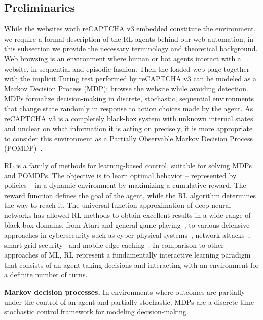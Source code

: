 \subsection{Preliminaries}

While the websites woth reCAPTCHA v3 embedded constitute the environment, we require a formal description of the \gls{RL} agents behind our web automation; in this subsection we provide the necessary terminology and theoretical background.
Web browsing is an environment where human or bot agents interact with a website, in sequential and episodic fashion.
Then the loaded web page together with the implicit Turing test performed by reCAPTCHA v3 can be modeled as a Markov Decision Process (MDP): browse the website while avoiding detection.
MDPs formalize decision-making in discrete, stochastic, sequential environments that change state randomly in response to action choices made by the agent.
As reCAPTCHA v3 is a completely black-box system with unknown internal states and unclear on what information it is acting on precisely, it is more appropriate to consider this environment as a Partially Observable Markov Decision Process (POMDP)~\cite{kaelbling1998planning}.

\gls{RL} is a family of methods for learning-based control, suitable for solving MDPs and POMDPs.
The objective is to learn optimal behavior -- represented by policies -- in a dynamic environment by maximizing a cumulative reward. 
The reward function defines the goal of the agent, while the \gls{RL} algorithm determines the way to reach it.
The universal function approximation of deep neural networks has allowed \gls{RL} methods to obtain excellent results in a wide range of black-box domains, from Atari and general game playing~\cite{Mnih2013}, to various defensive approaches in cybersecurity such as cyber-physical systems~\cite{Ferdowsi2018a}, network attacks~\cite{Malialis2015}, smart grid security~\cite{Ni2019} and mobile edge caching~\cite{Xiao2018a}.
In comparison to other approaches of \gls{ML}, \gls{RL} represent a fundamentally interactive learning paradigm that consists of an agent taking decisions and interacting with an environment for a definite number of turns.

\textbf{Markov decision processes.} In environments where outcomes are partially under the control of an agent and partially stochastic, MDPs are a discrete-time stochastic control framework for modeling decision-making.

